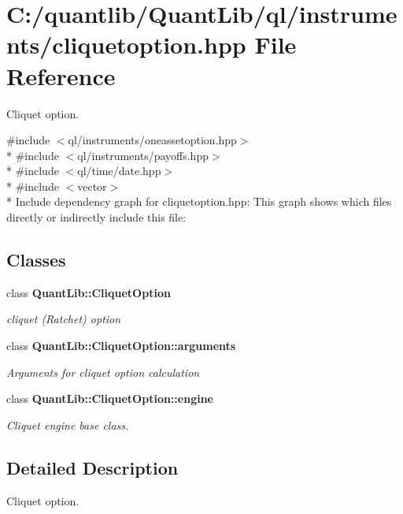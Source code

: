 \section{C\+:/quantlib/\+Quant\+Lib/ql/instruments/cliquetoption.hpp File Reference}
\label{cliquetoption_8hpp}


Cliquet option.  


{\ttfamily \#include $<$ql/instruments/oneassetoption.\+hpp$>$}\\*
{\ttfamily \#include $<$ql/instruments/payoffs.\+hpp$>$}\\*
{\ttfamily \#include $<$ql/time/date.\+hpp$>$}\\*
{\ttfamily \#include $<$vector$>$}\\*
Include dependency graph for cliquetoption.\+hpp\+:
This graph shows which files directly or indirectly include this file\+:
\subsection*{Classes}
\begin{DoxyCompactItemize}
\item 
class {\bf Quant\+Lib\+::\+Cliquet\+Option}
\begin{DoxyCompactList}\small\item\em cliquet (Ratchet) option \end{DoxyCompactList}\item 
class {\bf Quant\+Lib\+::\+Cliquet\+Option\+::arguments}
\begin{DoxyCompactList}\small\item\em Arguments for cliquet option calculation \end{DoxyCompactList}\item 
class {\bf Quant\+Lib\+::\+Cliquet\+Option\+::engine}
\begin{DoxyCompactList}\small\item\em Cliquet engine base class. \end{DoxyCompactList}\end{DoxyCompactItemize}


\subsection{Detailed Description}
Cliquet option. 

